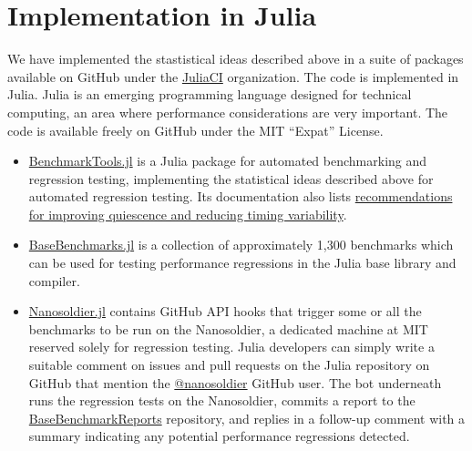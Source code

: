 \documentclass[conference]{IEEEtran}
\begin{document}


\section{Implementation in Julia}

We have implemented the stastistical ideas described above in a suite of packages available on GitHub under the \href{https://github.com/JuliaCI}{JuliaCI} organization.
The code is implemented in Julia. Julia is an emerging programming language designed for technical computing, an area where performance considerations are very important.
The code is available freely on GitHub under the MIT ``Expat'' License.

\begin{itemize}

\item
\href{https://github.com/JuliaCI/BenchmarkTools.jl}{BenchmarkTools.jl}
is a Julia package for automated benchmarking and regression testing, implementing the statistical ideas described above for automated regression testing. Its documentation also lists \href{https://github.com/JuliaCI/BenchmarkTools.jl/blob/60dfe83e5434c87b7311ca5d9f185f45752ed510/doc/linuxtips.md}{recommendations for improving quiescence and reducing timing variability}.

\item
\href{https://github.com/JuliaCI/BaseBenchmarks.jl}{BaseBenchmarks.jl}
is a collection of approximately 1,300 benchmarks which can be used for testing performance regressions in the Julia base library and compiler.

\item
\href{https://github.com/JuliaCI/Nanosoldier.jl}{Nanosoldier.jl}
contains GitHub API hooks that trigger some or all the benchmarks to be run on the Nanosoldier, a dedicated machine at MIT reserved solely for regression testing.
Julia developers can simply write a suitable comment on issues and pull requests on the Julia repository on GitHub that mention the \href{https://github.com/nanosoldier}{@nanosoldier} GitHub user. The bot underneath runs the regression tests on the Nanosoldier, commits a report to the \href{https://github.com/JuliaCI/BaseBenchmarkReports}{BaseBenchmarkReports} repository, and replies in a follow-up comment with a summary indicating any potential performance regressions detected.

\end{itemize}
\end{document}
